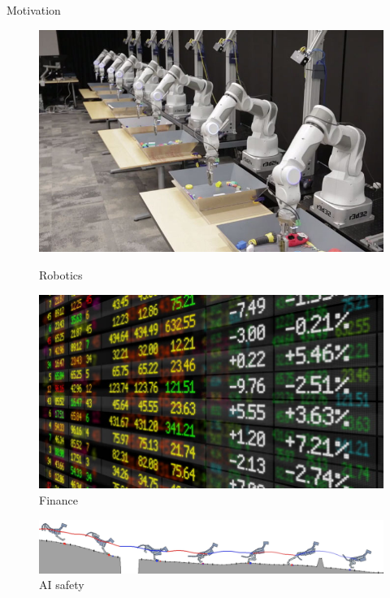 \documentclass{beamer}
\begin{document}
\begin{frame}{Motivation}
\begin{figure}
    \centering
    \begin{minipage}{0.45\textwidth}
        \centering
        \includegraphics[width=0.87\linewidth]{../gfx/Deep-Learning-for-Robots.jpg}
        \caption{Robotics}
    \end{minipage}\hfill
    \begin{minipage}{0.45\textwidth}
        \centering
        \includegraphics[width=\linewidth]{../gfx/stock_market.jpg}
        \caption{Finance}
    \end{minipage}
\end{figure}

\begin{figure}
\includegraphics[width=\linewidth]{../gfx/running_tiger.png}
\caption{AI safety}
\end{figure}


\end{frame}
\end{document}

